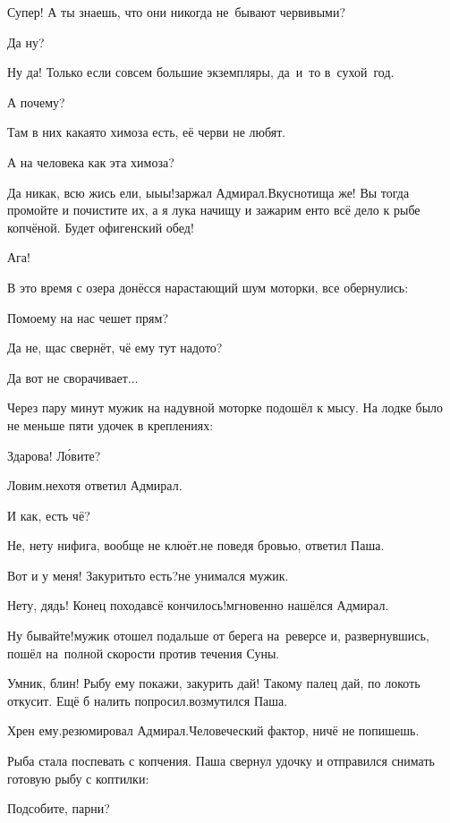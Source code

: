 \diagdash Супер! А ты знаешь, что они никогда не~бывают червивыми?

\diagdash Да ну?

\diagdash Ну да! Только если совсем большие экземпляры, да~и~то в~сухой~год.

\diagdash А почему?

\diagdash Там в них какая\sdash то химоза есть, её черви не любят.

\diagdash А на человека как эта химоза?

\diagdash Да никак, всю жись ели, ы\sdash ы\sdash ы!\mdash заржал Адмирал.\mdash Вкуснотища же! Вы тогда промойте и почистите их, а я лука начищу и зажарим енто всё дело к рыбе копчёной. Будет офигенский обед!

\diagdash Ага!

В это время с озера донёсся нарастающий шум моторки, все обернулись:

\diagdash По\sdash моему на нас чешет прям?

\diagdash Да не, щас свернёт, чё ему тут надо\sdash то?

\diagdash Да вот не сворачивает$\ldots$

Через пару минут мужик на надувной моторке подошёл к мысу. На лодке было не меньше пяти удочек в креплениях:

\diagdash Здарова! Л\'{о}вите?

\diagdash Ловим.\mdash нехотя ответил Адмирал.

\diagdash И как, есть чё?

\diagdash Не, нету нифига, вообще не клюёт.\mdash не поведя бровью, ответил Паша.

\diagdash Вот и у меня! Закурить\sdash то есть?\mdash не унимался мужик.

\diagdash Нету, дядь! Конец похода\mdash всё кончилось!\mdash мгновенно нашёлся Адмирал.

\diagdash Ну бывайте!\mdash мужик отошел подальше от берега на~реверсе и, развернувшись, пошёл на~полной скорости против течения Суны. 

\diagdash Умник, блин! Рыбу ему покажи, закурить дай! Такому палец дай, по локоть откусит. Ещё б налить попросил.\mdash возмутился Паша.

\diagdash Хрен ему.\mdash резюмировал Адмирал.\mdash Человеческий фактор, ничё не попишешь.

Рыба стала поспевать с копчения. Паша свернул удочку и отправился снимать готовую рыбу с коптилки:

\diagdash Подсобите, парни?

